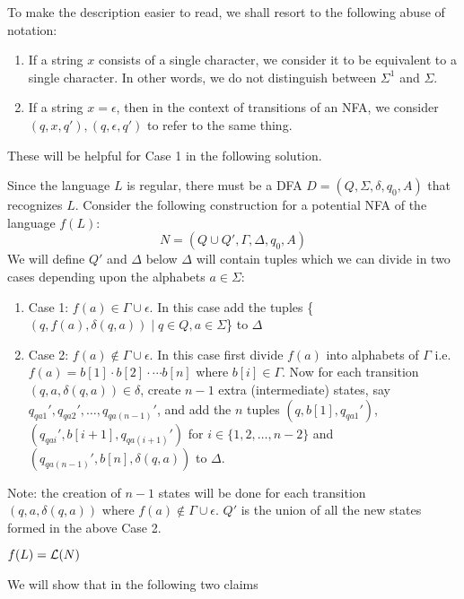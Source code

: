 \begin{note}
    To make the description easier to read, we shall resort to the following abuse of notation:
    \begin{enumerate}
        \item If a string $x$ consists of a single character, we consider it to be equivalent to a single character. In other words, we do not distinguish between $\Sigma^1$ and $\Sigma$.
        \item If a string $x = \epsilon$, then in the context of transitions of an NFA, we consider $(q, x, q'), (q, \epsilon, q')$ to refer to the same thing.
    \end{enumerate}
    These will be helpful for Case 1 in the following solution.
\end{note}

\begin{soln}
	Since the language $L$ is regular, there must be a DFA $D = (Q, \Sigma, \delta, q_0, A)$ that recognizes $L$.
	Consider the following construction for a potential NFA of the language $f(L)$:
	$$
		N = (Q \cup Q', \Gamma, \Delta, {q_0}, A)
	$$
	We will define $Q'$ and $\Delta$ below
	\newline $\Delta$ will contain tuples which we can divide in two cases depending upon the alphabets $a\in \Sigma$:
	\begin{enumerate}
        \item Case 1: $f(a) \in \Gamma \cup \epsilon$. In this case add the tuples \{$(q,f(a),\delta(q,a)) \mid  q\in Q, a \in \Sigma$\} to $\Delta$
		\item Case 2: $f(a) \not\in \Gamma \cup \epsilon$. In this case first divide $f(a)$ into alphabets of $\Gamma$ i.e. $f(a)=b[1] \cdot b[2] \cdot \cdots b[n]$ where $b[i] \in \Gamma$.
		    Now for
            each transition $(q,a,\delta(q,a)) \in \delta$, create $n-1$ extra (intermediate) states, say $q_{qa1}',q_{qa2}', \ldots, q_{qa(n-1)}'$, and add the $n$ tuples
            $(q,b[1],q_{qa1}')$, $(q_{qai}',b[i+1],q_{qa(i+1)}')$ for $i \in \{1,2, \ldots, n-2\}$ and $(q_{qa(n-1)}',b[n],\delta(q,a))$ to $\Delta$.
	\end{enumerate}
	Note: the creation of $n-1$ states will be done for each transition $(q,a,\delta(q,a))$ where  $f(a) \not\in \Gamma \cup \epsilon$.
	$Q'$ is the union of all the new states formed in the above Case 2.\\

	\begin{claim}
		$f(L) = \mathcal{L}(N)$
	\end{claim}
	We will show that in the following two claims\\


\end{soln}
